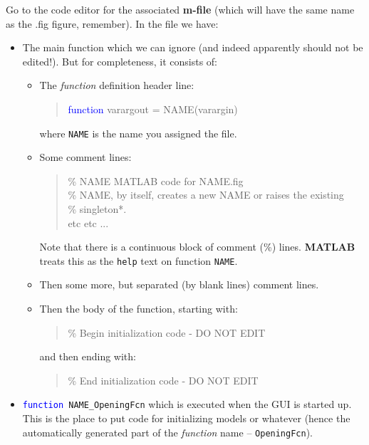 \documentclass{tufte-book} %
\newenvironment{docspecmargin}{\begin{quotation}\ttfamily\footnotesize\parskip0pt\parindent0pt\ignorespaces}{\end{quotation}}
\begin{document}
Go to the code editor for the associated \textbf{m-file} (which will have the same name as the \textsf{.fig} figure, remember). In the file we have:
\begin{itemize}
\setlength{\itemindent}{.2in}

\item The main function which we can ignore (and indeed apparently should not be edited!). But for completeness, it consists of:
\begin{itemize}[noitemsep]
\setlength{\itemindent}{.2in}
\item The \textit{function} definition header line:
\begin{docspecmargin}
\textcolor{blue}{function} varargout = NAME(varargin)
\end{docspecmargin}
where \texttt{NAME} is the name you assigned the file.
\item Some comment lines:
\begin{docspecmargin}
\textcolor[rgb]{0,0.501961,0}{\% NAME MATLAB code for NAME.fig\\
\%      NAME, by itself, creates a new NAME or raises the existing\\
\%      singleton*.}\\
etc etc ...
\end{docspecmargin}
Note that there is a continuous block of comment (\textcolor[rgb]{0,0.501961,0}{\%}) lines. \textbf{MATLAB} treats this as the \texttt{help} text on function \texttt{NAME}.
\item Then some more, but separated (by blank lines) comment lines.
\item Then the body of the function, starting with:
\begin{docspecmargin}
\textcolor[rgb]{0,0.501961,0}{\% Begin initialization code - DO NOT EDIT}
\end{docspecmargin}
and then ending with:
\begin{docspecmargin}
\textcolor[rgb]{0,0.501961,0}{\% End initialization code - DO NOT EDIT}
\end{docspecmargin}
\end{itemize}

\item \texttt{\textcolor{blue}{function} NAME\_OpeningFcn} which is executed when the GUI is started up. This is the place to put code for initializing models or whatever (hence the automatically generated part of the \textit{function} name -- \texttt{OpeningFcn}).


\end{itemize}
\end{document}
